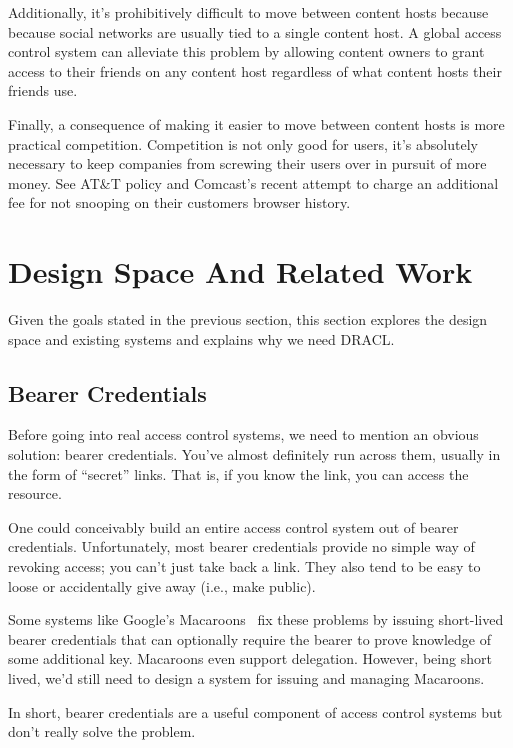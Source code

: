 \documentclass[pdftex,12pt,a4papaer]{report}
\begin{document}
Additionally, it's prohibitively difficult to move between content hosts because
because social networks are usually tied to a single content host. A global
access control system can alleviate this problem by allowing content owners to
grant access to their friends on any content host regardless of what content
hosts their friends use.

Finally, a consequence of making it easier to move between content hosts is
more practical competition. Competition is not only good for users, it's
absolutely necessary to keep companies from screwing their users over in pursuit
of more money. See AT\&T\texttrademark{}\cite{att} policy and
Comcast's\texttrademark{}\cite{comcast} recent attempt to charge an additional
fee for not snooping on their customers browser history.

\section{Design Space And Related Work} 

Given the goals stated in the previous section, this section explores the design
space and existing systems and explains why we need DRACL.

\subsection{Bearer Credentials}

Before going into real access control systems, we need to mention an obvious
solution: bearer credentials. You've almost definitely run across them, usually
in the form of ``secret'' links. That is, if you know the link, you can access
the resource.

One could conceivably build an entire access control system out of bearer
credentials. Unfortunately, most bearer credentials provide no simple way of
revoking access; you can't just take back a link. They also tend to be easy to
loose or accidentally give away (i.e., make public).

Some systems like Google's Macaroons~\cite{macaroon} fix these problems by
issuing short-lived bearer credentials that can optionally require the bearer to
prove knowledge of some additional key. Macaroons even support delegation.
However, being short lived, we'd still need to design a system for issuing and
managing Macaroons.

In short, bearer credentials are a useful component of access control systems
but don't really solve the problem.
\end{document}
